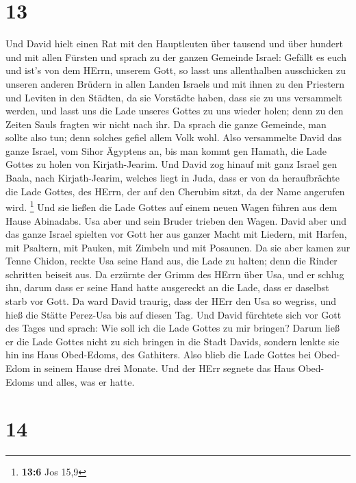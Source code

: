 \hypertarget{section-12}{%
\section{13}\label{section-12}}

 Und David hielt einen Rat mit den Hauptleuten über
tausend und über hundert und mit allen Fürsten  und sprach
zu der ganzen Gemeinde Israel: Gefällt es euch und ist's von dem HErrn,
unserem Gott, so lasst uns allenthalben ausschicken zu unseren anderen
Brüdern in allen Landen Israels und mit ihnen zu den Priestern und
Leviten in den Städten, da sie Vorstädte haben, dass sie zu uns
versammelt werden,  und lasst uns die Lade unseres Gottes
zu uns wieder holen; denn zu den Zeiten Sauls fragten wir nicht nach
ihr.  Da sprach die ganze Gemeinde, man sollte also tun;
denn solches gefiel allem Volk wohl.  Also versammelte
David das ganze Israel, vom Sihor Ägyptens an, bis man kommt gen Hamath,
die Lade Gottes zu holen von Kirjath-Jearim.  Und David
zog hinauf mit ganz Israel gen Baala, nach Kirjath-Jearim, welches liegt
in Juda, dass er von da heraufbrächte die Lade Gottes, des HErrn, der
auf den Cherubim sitzt, da der Name angerufen wird. \footnote{\textbf{13:6}
  Jos 15,9}  Und sie ließen die Lade Gottes auf einem
neuen Wagen führen aus dem Hause Abinadabs. Usa aber und sein Bruder
trieben den Wagen.  David aber und das ganze Israel
spielten vor Gott her aus ganzer Macht mit Liedern, mit Harfen, mit
Psaltern, mit Pauken, mit Zimbeln und mit Posaunen.  Da
sie aber kamen zur Tenne Chidon, reckte Usa seine Hand aus, die Lade zu
halten; denn die Rinder schritten beiseit aus.  Da
erzürnte der Grimm des HErrn über Usa, und er schlug ihn, darum dass er
seine Hand hatte ausgereckt an die Lade, dass er daselbst starb vor
Gott.  Da ward David traurig, dass der HErr den Usa so
wegriss, und hieß die Stätte Perez-Usa bis auf diesen Tag.
 Und David fürchtete sich vor Gott des Tages und sprach:
Wie soll ich die Lade Gottes zu mir bringen?  Darum ließ
er die Lade Gottes nicht zu sich bringen in die Stadt Davids, sondern
lenkte sie hin ins Haus Obed-Edoms, des Gathiters.  Also
blieb die Lade Gottes bei Obed-Edom in seinem Hause drei Monate. Und der
HErr segnete das Haus Obed-Edoms und alles, was er hatte.

\hypertarget{section-13}{%
\section{14}\label{section-13}}

